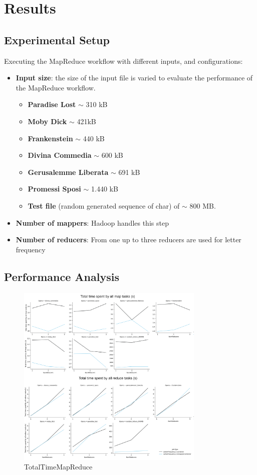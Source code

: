 \newpage
\section{Results}
\subsection{Experimental Setup}
Executing the MapReduce workflow with different inputs, and configurations:
\begin{itemize}
  \item \textbf{Input size}: the size of the input file is varied to evaluate the performance of the MapReduce workflow.
        \begin{itemize}
          \item \textbf{Paradise Lost} $\sim$ 310 kB
          \item \textbf{Moby Dick} $\sim$ 421kB
          \item \textbf{Frankenstein} $\sim$ 440 kB
          \item \textbf{Divina Commedia} $\sim$ 600 kB
          \item \textbf{Gerusalemme Liberata} $\sim$ 691 kB
          \item \textbf{Promessi Sposi} $\sim$ 1.440 kB
          \item \textbf{Test file} (random generated sequence of char) of $\sim$ 800 MB.
        \end{itemize}
  \item \textbf{Number of mappers}: Hadoop handles this step
  \item \textbf{Number of reducers}: From one up to three reducers are used for letter frequency
\end{itemize}

\subsection{Performance Analysis}
  
\begin{figure}[H]
  \centering
  \includegraphics[width=0.8\textwidth]{media/performance/TotalTimeMapReduce.png}
  \caption{TotalTimeMapReduce}
  \label{fig:TotalTimeMapReduce}
\end{figure}

